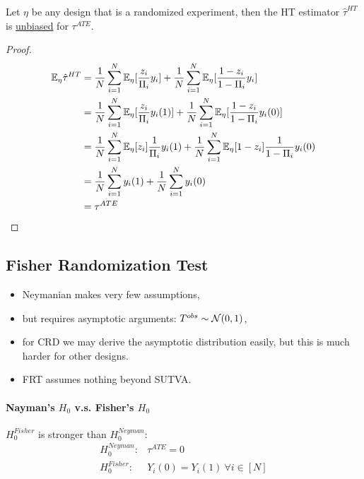 \documentclass[11pt]{article}
\newcommand{\tauhat}[0]{\hat{\tau}}
\begin{document}
	\begin{proposition}
		Let $\eta$ be any design that is a randomized experiment, then the HT estimator $\tauhat^{HT}$ is \ul{unbiased} for $\tau^{ATE}$.
		\begin{proof}
			\begin{align}
				\expe_\eta \tauhat^{HT} &= \frac{1}{N} \sum_{i=1}^N \expe_\eta [\frac{z_i}{\Pi_i}y_i] + \frac{1}{N} \sum_{i=1}^N \expe_\eta[\frac{1-z_i}{1-\Pi_i}y_i] \\
				&= \frac{1}{N} \sum_{i=1}^N \expe_\eta [\frac{z_i}{\Pi_i}y_i(1)] + \frac{1}{N} \sum_{i=1}^N \expe_\eta[\frac{1-z_i}{1-\Pi_i}y_i(0)] \\
				&= \frac{1}{N} \sum_{i=1}^N \expe_\eta[z_i] \frac{1}{\Pi_i}y_i(1) + \frac{1}{N} \sum_{i=1}^N \expe_\eta[1-z_i] \frac{1}{1-\Pi_i}y_i(0) \\
				&= \frac{1}{N} \sum_{i=1}^N y_i(1) + \frac{1}{N} \sum_{i=1}^N y_i(0) \\
				&= \tau^{ATE}
			\end{align}
		\end{proof}
	\end{proposition}
	
	\subsection{Fisher Randomization Test}
	\begin{itemize}
		\item Neymanian makes very few assumptions,
		\item but requires asymptotic arguments: $T^{obs} \sim \mathcal{{N}}(0, 1)$,
		\item for CRD we may derive the asymptotic distribution easily, but this is much harder for other designs.
		\item FRT assumes nothing beyond SUTVA.
	\end{itemize}
	\paragraph{Nayman's $H_0$ v.s. Fisher's $H_0$} $H_0^{Fisher}$ is stronger than $H_0^{Neyman}$:
	\begin{align}
		H_0^{Neyman}:& \tau^{ATE} = 0 \\
		H_0^{Fisher}:& Y_i(0) = Y_i(1)\ \forall i \in [N]
	\end{align}
\end{document}
